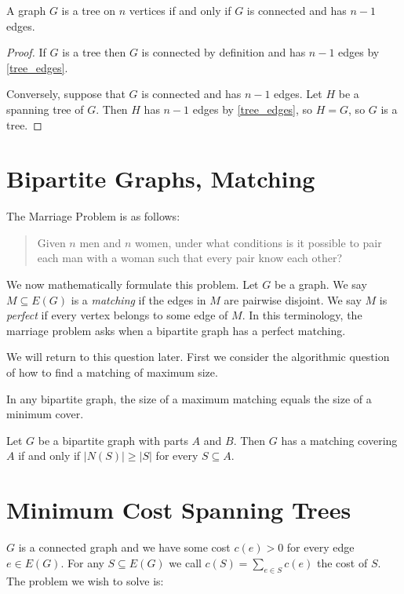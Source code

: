 \begin{lemma}
A graph $G$ is a tree on $n$ vertices if and only if $G$ is connected and has $n-1$ edges.
\end{lemma}

\begin{proof}
If $G$ is a tree then $G$ is connected by definition and has $n-1$ edges by \cref{tree_edges}. 

Conversely, suppose that $G$ is connected and has $n-1$ edges. Let $H$ be a spanning tree of $G$. Then $H$ has $n-1$ edges by \cref{tree_edges}, so $H = G$, so $G$ is a tree.
\end{proof}

\section{Bipartite Graphs, Matching}
The Marriage Problem is as follows:

\begin{quote}
Given $n$ men and $n$ women, under what conditions is it possible to pair each man with a woman such that every pair know each other?
\end{quote}

We now mathematically formulate this problem. Let $G$ be a graph. We say $M\subseteq E(G)$ is a \emph{matching} if the edges in $M$ are pairwise disjoint. We say $M$ is \emph{perfect} if every vertex belongs to some edge of $M$. 
In this terminology, the marriage problem asks when a bipartite graph has a perfect matching.

We will return to this question later. First we consider the algorithmic question of how to find a matching of maximum size.

\begin{theorem}
In any bipartite graph, the size of a maximum matching equals the size of a minimum cover.
\end{theorem}

\begin{theorem}
Let $G$ be a bipartite graph with parts $A$ and $B$. Then $G$ has a matching covering $A$ if and only if $|N(S)|\ge|S|$ for every $S\subseteq A$.
\end{theorem}

\section{Minimum Cost Spanning Trees}
$G$ is a connected graph and we have some cost $c(e)>0$ for every edge $e\in E(G)$. For any $S\subseteq E(G)$ we call $c(S)=\sum_{e\in S}c(e)$ the cost of $S$. The problem we wish to solve is:

